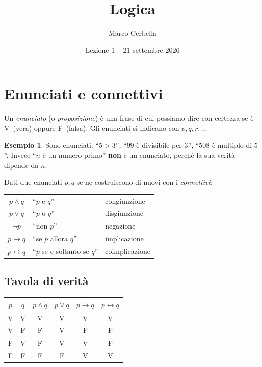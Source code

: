 \documentclass[11pt,a4paper]{article}
\title{Logica}
\author{Marco Cerbella}
\date{Lezione 1 -- 21 settembre 2026}
\theoremstyle{definition}
\newtheorem*{esempio}{Esempio}
\newcommand{\V}{\textsf{V}}
\newcommand{\F}{\textsf{F}}
\begin{document}
\maketitle

\section{Enunciati e connettivi}

\begin{definizione}
Un \emph{enunciato} (o \emph{proposizione}) è una frase di cui possiamo
dire con certezza se è \V\ (vera) oppure \F\ (falsa). Gli enunciati si
indicano con $p, q, r, \dots$
\end{definizione}

\begin{esempio}
Sono enunciati: ``$5 > 3$'', ``$99$ è divisibile per $3$'',
``$508$ è multiplo di $5$''. Invece ``$n$ è un numero primo'' \textbf{non}
è un enunciato, perché la sua verità dipende da $n$.
\end{esempio}

Dati due enunciati $p, q$ se ne costruiscono di nuovi con i
\emph{connettivi}:
\begin{center}
\begin{tabular}{cll}
$p \land q$ & ``$p$ e $q$'' & congiunzione \\
$p \lor q$ & ``$p$ o $q$'' & disgiunzione \\
$\neg p$ & ``non $p$'' & negazione \\
$p \to q$ & ``se $p$ allora $q$'' & implicazione \\
$p \leftrightarrow q$ & ``$p$ se e soltanto se $q$'' & coimplicazione
\end{tabular}
\end{center}

\subsection*{Tavola di verità}

\begin{center}
\begin{tabular}{cc|c|c|c|c}
$p$ & $q$ & $p \land q$ & $p \lor q$ & $p \to q$ & $p \leftrightarrow q$ \\ \hline
\V & \V & \V & \V & \V & \V \\
\V & \F & \F & \V & \F & \F \\
\F & \V & \F & \V & \V & \F \\
\F & \F & \F & \F & \V & \V
\end{tabular}
\end{center}
\end{document}
